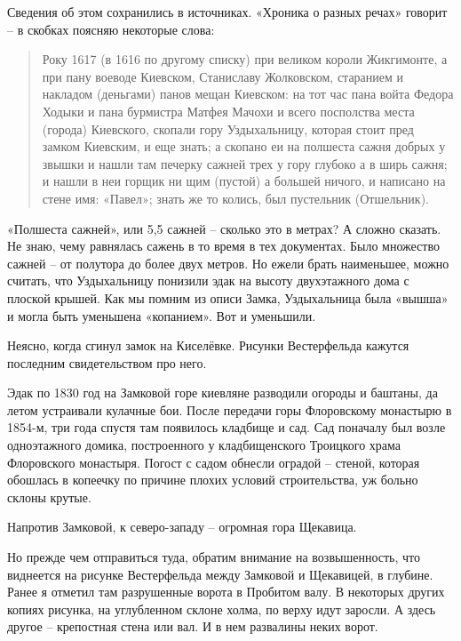Сведения об этом сохранились в источниках. «Хроника о разных речах»\cite[стр. 85]{sbornikletug} говорит – в скобках поясняю некоторые слова:

\begin{quotation}
Року 1617 (в 1616 по другому списку) при великом короли Жикгимонте, а при пану воеводе Киевском, Станиславу Жолковском, старанием и накладом (деньгами) панов мещан Киевском: на тот час пана войта Федора Ходыки и пана бурмистра Матфея Мачохи и всего посполства места (города) Киевского, скопали гору Уздыхальницу, которая стоит пред замком Киевским, и еще знать; а скопано еи на полшеста сажня добрых у звышки и нашли там печерку сажней трех у гору глубоко а в ширь сажня; и нашли в неи горщик ни щим (пустой) а большей ничого, и написано на стене имя: «Павел»; знать же то колись, был пустельник (Отшельник).
\end{quotation}

«Полшеста сажней», или 5,5 сажней – сколько это в метрах? А сложно сказать. Не знаю, чему равнялась сажень в то время в тех документах. Было множество сажней – от полутора до более двух метров. Но ежели брать наименьшее, можно считать, что Уздыхальницу понизили эдак на высоту двухэтажного дома с плоской крышей. Как мы помним из описи Замка, Уздыхальница была «вышша» и могла быть уменьшена «копанием». Вот и уменьшили.


Неясно, когда сгинул замок на Киселёвке. Рисунки Вестерфельда кажутся последним свидетельством про него.

Эдак по 1830 год на Замковой горе киевляне разводили огороды и баштаны, да летом устраивали кулачные бои. После передачи горы Флоровскому монастырю в 1854-м, три года спустя там появилось кладбище и сад. Сад поначалу был возле одноэтажного домика, построенного у кладбищенского Троицкого храма Флоровского монастыря. Погост с садом обнесли оградой – стеной, которая обошлась в копеечку по причине плохих условий строительства, уж больно склоны крутые.

Напротив Замковой, к северо-западу – огромная гора Щекавица.

Но прежде чем отправиться туда, обратим внимание на возвышенность, что виднеется на рисунке Вестерфельда между Замковой и Щекавицей, в глубине. Ранее я отметил там разрушенные ворота в Пробитом валу. В некоторых других копиях рисунка, на углубленном склоне холма, по верху идут заросли. А здесь другое – крепостная стена или вал. И в нем развалины неких ворот.

